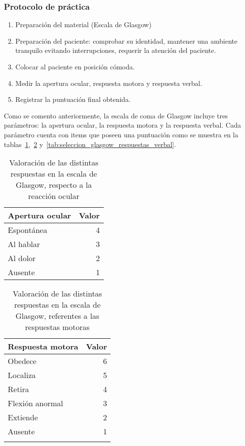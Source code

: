 \subsubsection{Protocolo de práctica}
\label{sec:glasgow_protocolo}

\begin{enumerate}
\item Preparación del material (Escala de Glasgow)
\item Preparación del paciente: comprobar su identidad, mantener una ambiente
    tranquilo evitando interrupciones, requerir la atención del paciente.
\item Colocar al paciente en posición cómoda.
\item Medir la apertura ocular, respuesta motora y respuesta verbal.
\item Registrar la puntuación final obtenida.
\end{enumerate}

Como se comento anteriormente, la escala de coma de Glasgow incluye tres
parámetros: la apertura ocular, la respuesta motora y la respuesta verbal. Cada
parámetro cuenta con items que poseen una puntuación como se muestra en la
tablas~\ref{tab:seleccion_glasgow_respuestas_ocular},~\ref{tab:seleccion_glasgow_respuestas_motor}
y~\ref{tab:seleccion_glasgow_respuestas_verbal}. 

\begin{table}[!hbt]
\centering
\begin{tabular}{lr}
\toprule
\textbf{Apertura ocular} & \textbf{Valor} \\
\midrule
Espontánea & 4 \\
Al hablar & 3 \\
Al dolor & 2 \\
Ausente & 1 \\
\bottomrule
\end{tabular}
\caption{Valoración de las distintas respuestas en la escala de Glasgow,
    respecto a la reacción ocular}
\label{tab:seleccion_glasgow_respuestas_ocular}
\end{table}

\begin{table}[!hbt]
\centering
\begin{tabular}{lr}
\toprule
\textbf{Respuesta motora} & \textbf{Valor} \\
\midrule
Obedece & 6 \\
Localiza & 5 \\
Retira & 4 \\
Flexión anormal & 3 \\
Extiende & 2 \\
Ausente & 1 \\
 & \\
\bottomrule
\end{tabular}
\caption{Valoración de las distintas respuestas en la escala de Glasgow,
    referentes a las respuestas motoras}
\label{tab:seleccion_glasgow_respuestas_motor}
\end{table}

